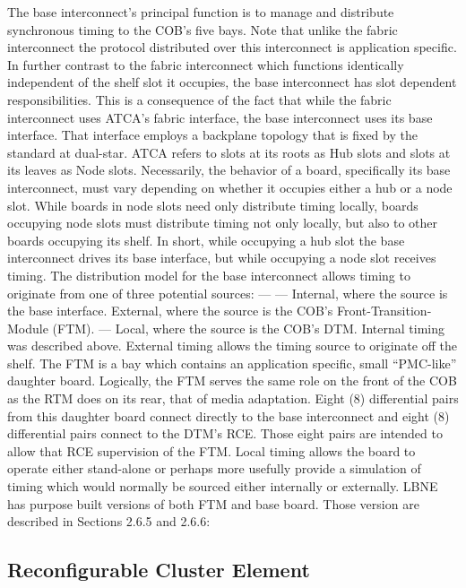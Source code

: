 The base interconnect's principal function is to manage and distribute synchronous timing to the COB's five bays. Note that unlike the fabric interconnect the protocol distributed over this interconnect is application specific. In further contrast to the fabric interconnect which functions identically independent of the shelf slot it occupies, the base interconnect has slot dependent responsibilities. This is a consequence of the fact that while the fabric interconnect uses ATCA's fabric interface, the base interconnect uses its base interface. That interface employs a backplane topology that is fixed by the standard at dual-star. ATCA refers to slots at its roots as Hub slots and slots at its leaves as Node slots. Necessarily, the behavior of a board, specifically its base interconnect, must vary depending on whether it occupies either a hub or a node slot. While boards in node slots need only distribute timing locally, boards occupying node slots must distribute timing not only locally, but also to other boards occupying its shelf. In short, while occupying a hub slot the base interconnect drives its base interface, but while occupying a node slot receives timing.
The distribution model for the base interconnect allows timing to originate from one of three potential sources:
— —
Internal, where the source is the base interface.
External, where the source is the COB's Front-Transition-Module (FTM).
— Local, where the source is the COB's DTM.
Internal timing was described above. External timing allows the timing source to originate off the shelf. The FTM is a bay which contains an application specific, small “PMC-like” daughter board. Logically, the FTM serves the same role on the front of the COB as the RTM does on its rear, that of media adaptation. Eight (8) differential pairs from this daughter board connect directly to the base interconnect and eight (8) differential pairs connect to the DTM's RCE. Those eight pairs are intended to allow that RCE supervision of the FTM. Local timing allows the board to operate either stand-alone or perhaps more usefully provide a simulation of timing which would normally be sourced either internally or externally.
LBNE has purpose built versions of both FTM and base board. Those version are described in Sections 2.6.5 and 2.6.6:


\subsection{Reconfigurable Cluster Element}

